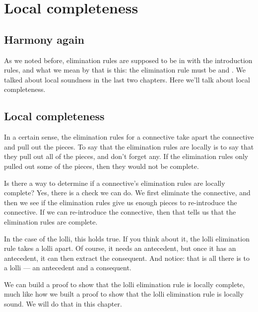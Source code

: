 \documentclass[../../../main.tex]{subfiles}
\begin{document}
\chapter{Local completeness}


\section{Harmony again}

As we noted before, elimination rules are supposed to be in  with the introduction rules, and what we mean by that is this: the elimination rule must be  and . We talked about local soundness in the last two chapters. Here we'll talk about local completeness.


\section{Local completeness}

In a certain sense, the elimination rules for a connective take apart the connective and pull out the pieces. To say that the elimination rules are locally  is to say that they pull out all of the pieces, and don't forget any. If the elimination rules only pulled out some of the pieces, then they would not be complete.

Is there a way to determine if a connective's elimination rules are locally complete? Yes, there is a check we can do. We first eliminate the connective, and then we see if the elimination rules give us enough pieces to re-introduce the connective. If we can re-introduce the connective, then that tells us that the elimination rules are complete.

In the case of the lolli, this holds true. If you think about it, the lolli elimination rule takes a lolli apart. Of course, it needs an antecedent, but once it has an antecedent, it can then extract the consequent. And notice: that is all there is to a lolli --- an antecedent and a consequent.

We can build a proof to show that the lolli elimination rule is locally complete, much like how we built a proof to show that the lolli elimination rule is locally sound. We will do that in this chapter.
\end{document}
